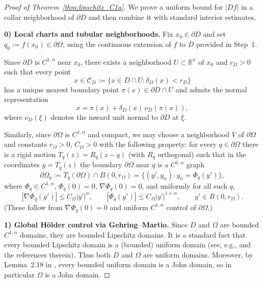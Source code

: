 \documentclass{amsart}
\newcommand{\R}{\mathbb{R}}
\begin{document}
\begin{proof}[Proof of Theorem~\ref{thm:lipschitz_C1a}]
We prove a uniform bound for $|Df|$ in a collar neighborhood of $\partial D$ and then combine it
with standard interior estimates.

\medskip
\noindent\textbf{0) Local charts and tubular neighborhoods.}
Fix $x_0\in\partial D$ and set $q_0:=f(x_0)\in\partial\Omega$,
using the continuous extension of $f$ to $\overline D$ provided in Step~1.

Since $\partial D$ is $C^{1,\alpha}$ near $x_0$, there exists a neighborhood $U\subset\R^n$ of $x_0$
and $r_D>0$ such that every point
\[
x\in \mathcal C_D:=\{x\in D\cap U:\delta_D(x)<r_D\}
\]
has a unique nearest boundary point $\pi(x)\in\partial D\cap U$ and admits the normal
representation
\begin{equation}\label{eq:tubular_D}
x=\pi(x)+\delta_D(x)\,\nu_D(\pi(x)),
\end{equation}
where $\nu_D(\xi)$ denotes the inward unit normal to $\partial D$ at $\xi$.

Similarly, since $\partial\Omega$ is $C^{1,\alpha}$ and compact, we may choose a neighborhood $V$
of $\partial\Omega$ and constants $r_\Omega>0$, $C_\Omega>0$ with the following property:
for every $q\in\partial\Omega$ there is a rigid motion $T_q(z)=R_q(z-q)$ (with $R_q$ orthogonal)
such that in the coordinates $y=T_q(z)$ the boundary $\partial\Omega$ near $q$ is a $C^{1,\alpha}$
graph
\[
\partial\Omega_q:=T_q(\partial\Omega)\cap B(0,r_\Omega)=\{(y',y_n): y_n=\Phi_q(y')\},
\]
where $\Phi_q\in C^{1,\alpha}$, $\Phi_q(0)=0$, $\nabla\Phi_q(0)=0$, and uniformly for all such $q$,
\begin{equation}\label{eq:Phi_uniform}
|\nabla\Phi_q(y')|\le C_\Omega |y'|^\alpha,
\qquad
|\Phi_q(y')|\le C_\Omega |y'|^{1+\alpha},
\qquad y'\in B(0,r_\Omega).
\end{equation}
(These follow from $\nabla\Phi_q(0)=0$ and uniform $C^{1,\alpha}$ control of $\partial\Omega$.)

\medskip
\noindent\textbf{1) Global H\"older control via Gehring--Martio.}
Since $D$ and $\Omega$ are bounded $C^{1,\alpha}$ domains,
they are bounded Lipschitz domains. It is a standard fact that every bounded Lipschitz domain is a (bounded)
uniform domain (see, e.g., \cite{BuckleyHerron,Vaisala} and the references therein). Thus both $D$ and $\Omega$ are uniform domains. Moreover, by Lemma~2.18 in \cite{GehringMartio}, every bounded uniform domain is a John domain, so in particular
$\Omega$ is a John domain. 


\end{proof}
\end{document}
